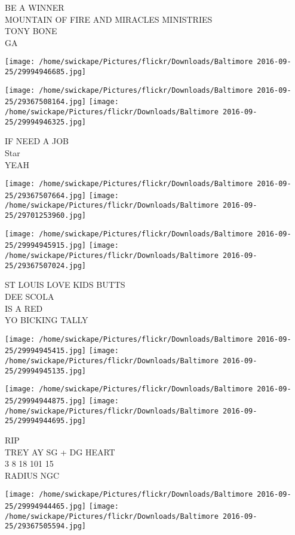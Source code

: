 \documentclass[10pt,letterpaper]{article}
\begin{document}
BE A WINNER\\
MOUNTAIN OF FIRE AND MIRACLES MINISTRIES\\
TONY BONE\\
GA\\
\pagebreak

\texttt{[image: /home/swickape/Pictures/flickr/Downloads/Baltimore 2016-09-25/29994946685.jpg]}

\vspace{0.25in}
\texttt{[image: /home/swickape/Pictures/flickr/Downloads/Baltimore 2016-09-25/29367508164.jpg]}
\texttt{[image: /home/swickape/Pictures/flickr/Downloads/Baltimore 2016-09-25/29994946325.jpg]}

IF NEED A JOB\\
Star\\
YEAH\\
\pagebreak

\texttt{[image: /home/swickape/Pictures/flickr/Downloads/Baltimore 2016-09-25/29367507664.jpg]}
\texttt{[image: /home/swickape/Pictures/flickr/Downloads/Baltimore 2016-09-25/29701253960.jpg]}

\texttt{[image: /home/swickape/Pictures/flickr/Downloads/Baltimore 2016-09-25/29994945915.jpg]}
\texttt{[image: /home/swickape/Pictures/flickr/Downloads/Baltimore 2016-09-25/29367507024.jpg]}

ST LOUIS LOVE KIDS BUTTS\\
DEE SCOLA\\
IS A RED\\
YO BICKING TALLY\\
\pagebreak

\texttt{[image: /home/swickape/Pictures/flickr/Downloads/Baltimore 2016-09-25/29994945415.jpg]}
\texttt{[image: /home/swickape/Pictures/flickr/Downloads/Baltimore 2016-09-25/29994945135.jpg]}

\texttt{[image: /home/swickape/Pictures/flickr/Downloads/Baltimore 2016-09-25/29994944875.jpg]}
\texttt{[image: /home/swickape/Pictures/flickr/Downloads/Baltimore 2016-09-25/29994944695.jpg]}

RIP\\
TREY AY SG + DG HEART\\
3 8 18 101 15\\
RADIUS NGC\\
\pagebreak

\texttt{[image: /home/swickape/Pictures/flickr/Downloads/Baltimore 2016-09-25/29994944465.jpg]}
\texttt{[image: /home/swickape/Pictures/flickr/Downloads/Baltimore 2016-09-25/29367505594.jpg]}
\end{document}
